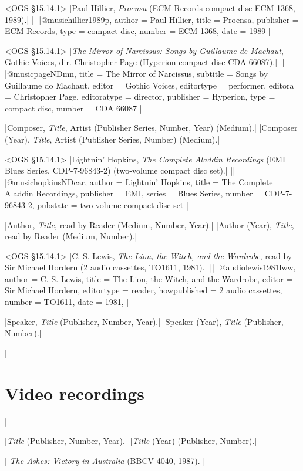 \documentclass[extrafontsizes,11pt,a4paper,oneside]{memoir}
\newcommand*{\lit}[1]{\textsf{#1}}
\begin{document}
\bibexample<OGS \S15.14.1>
|Paul Hillier, \emph{Proensa} (ECM Records compact disc ECM 1368, 1989).|%
||%
|@music{hillier1989p,
  author = {Paul Hillier},
  title = {Proensa},
  publisher = {ECM Records},
  type = {compact disc},
  number = {ECM 1368},
  date = {1989}
}|

\bibexample<OGS \S15.14.1>
|\emph{The Mirror of Narcissus: Songs by Guillaume de Machaut}, Gothic Voices, dir. Christopher Page (Hyperion compact disc CDA 66087).|%
||%
|@music{pageNDmn,
  title = {The Mirror of Narcissus},
  subtitle = {Songs by Guillaume do Machaut},
  editor = {{Gothic Voices}},
  editortype = {performer},
  editora = {Christopher Page},
  editoratype = {director},
  publisher = {Hyperion},
  type = {compact disc},
  number = {CDA 66087}
}|

\specs
|Composer, \emph{Title}, Artist (Publisher Series, Number, Year) (Medium).|%
|Composer (Year), \emph{Title}, Artist (Publisher Series, Number) (Medium).|

\bibexample<OGS \S15.14.1>
|Lightnin' Hopkins, \emph{The Complete Aladdin Recordings} (EMI Blues Series, CDP-7-96843-2) (two-volume compact disc set).|%
||%
|@music{hopkinsNDcar,
  author = {Lightnin’ Hopkins},
  title = {The Complete Aladdin Recordings},
  publisher = {EMI},
  series = {Blues Series},
  number = {CDP-7-96843-2},
  pubstate = {two-volume compact disc set}
}|

\specs
|Author, \emph{Title}, \lit{read by} Reader (Medium, Number, Year).|%
|Author (Year), \emph{Title}, \lit{read by} Reader (Medium, Number).|

\bibexample<OGS \S15.14.1>
|C. S. Lewis, \emph{The Lion, the Witch, and the Wardrobe}, read by Sir Michael Hordern (2 audio cassettes, TO1611, 1981).|%
||%
|@audio{lewis1981lww,
  author = {C. S. Lewis},
  title = {The Lion, the Witch, and the Wardrobe},
  editor = {Sir Michael Hordern},
  editortype = {reader},
  howpublished = {2 audio cassettes},
  number = {TO1611},
  date = {1981},
}|

\specs
|Speaker, \emph{Title} (Publisher, Number, Year).|%
|Speaker (Year), \emph{Title} (Publisher, Number).|

\todoc|
\section{Video recordings}
|

\specs
|\emph{Title} (Publisher, Number, Year).|%
|\emph{Title} (Year) (Publisher, Number).|

\todoc|
\emph{The Ashes: Victory in Australia} (BBCV 4040, 1987).
|
\end{document}
